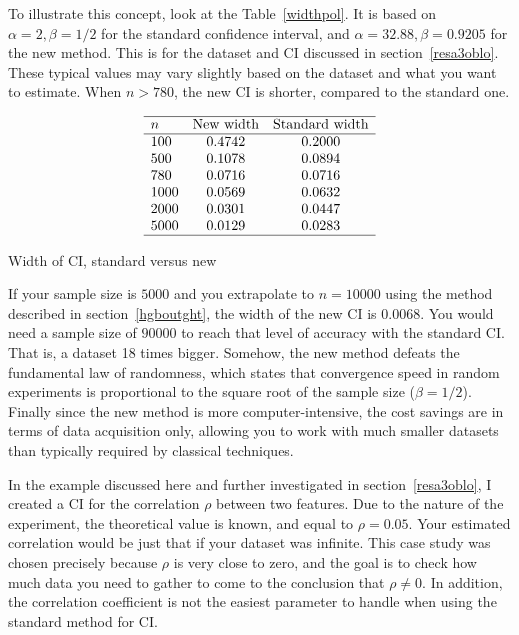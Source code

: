 \documentclass[oneside,10pt]{book}
\renewcommand{\arraystretch}{1.4} %
\begin{document}
To illustrate this concept, look at the Table~\ref{widthpol}. It is based on $\alpha = 2, \beta = 1/2$ for the standard confidence interval,   and $\alpha = 32.88, \beta=0.9205$ for the new method. This is for the
 dataset and CI discussed in section~\ref{resa3oblo}.  These typical values may vary slightly based on the dataset and what you want to estimate. When $n>780$, the new CI is shorter, compared to the standard one.

\renewcommand{\arraystretch}{1.0} %
\renewcommand{\arraystretch}{1.2} %
\begin{table}[H]
\small
\[
\begin{array}{lcc}
\hline
 n  &  \text{New width} & \text{Standard width} \\
\hline
100	& 0.4742	&0.2000\\
500	& 0.1078	&0.0894\\
780	&0.0716	&0.0716\\
1000	&0.0569	&0.0632\\
2000	&0.0301	&0.0447\\
5000	&0.0129	&0.0283\\
\hline
\end{array}
\]
\caption{\label{widthpol} Width of CI, standard versus new}
\end{table}
\renewcommand{\arraystretch}{1.0} %

If your sample size is $5000$ and you extrapolate to $n=\num{10000}$ using the method described in section~\ref{hgboutght},
 the width of the new CI is $0.0068$. You would need a sample size of $\num{90000}$ to reach that level of accuracy with the standard CI. That is, a dataset 18 times bigger. Somehow, the new method defeats the fundamental law of randomness, which states that convergence speed in random experiments is 
 proportional to the square root of the sample size ($\beta = 1/2$). Finally since the new method is more computer-intensive, the cost savings are in terms of data acquisition only, allowing you to work with much smaller datasets than typically required by classical
  techniques.

In the example discussed here and further investigated in section~\ref{resa3oblo}, I created a CI for the correlation $\rho$ between two features. Due to the nature of the experiment, the theoretical value is known, and equal to $\rho = 0.05$. Your estimated correlation  would  be just that if your dataset was infinite. This case study was chosen precisely because $\rho$ is very close to zero, and the goal is
 to check how much data you need to gather to come to the conclusion that $\rho\neq 0$. In addition, the correlation coefficient is not the easiest parameter to handle when using the standard method for CI.
\end{document}
